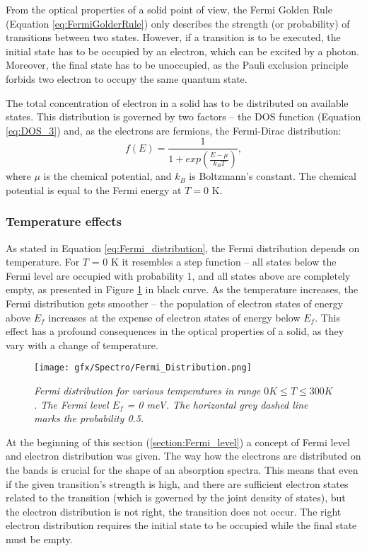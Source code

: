 \documentclass[titlepage,a4paper]{book}
\newcommand{\wciecie}{\quad\phantom{v}}
\begin{document}
From the optical properties of a solid point of view, the Fermi Golden Rule (Equation \ref{eq:FermiGolderRule}) only describes the strength (or probability) of transitions between two states. However, if a transition is to be executed, the initial state has to be occupied by an electron, which can be excited by a photon. Moreover, the final state has to be unoccupied, as the Pauli exclusion principle forbids two electron to occupy the same quantum state. 

The total concentration of electron in a solid has to be distributed on available states. This distribution is governed by two factors -- the DOS function (Equation \ref{eq:DOS_3}) and, as the electrons are fermions, the Fermi-Dirac distribution:
\begin{equation}
\label{eq:Fermi_distribution}
f(E) = \frac{1}{1+exp\left(\frac{E-\mu}{k_B T}\right)},
\end{equation}
where $\mu$ is the chemical potential, and $k_B$ is Boltzmann's constant. The chemical potential is equal to the Fermi energy at $T = 0$ K.

\subsubsection{Temperature effects}
\wciecie

As stated in Equation \ref{eq:Fermi_distribution}, the Fermi distribution depends on temperature. For $T$ = 0 K it resembles a step function -- all states below the Fermi level are occupied with probability 1, and all states above are completely empty, as presented in Figure \ref{fig:Fermi_Distribution} in black curve. As the temperature increases, the Fermi distribution gets smoother -- the population of electron states of energy above $E_f$ increases at the expense of electron states of energy below $E_f$. This effect has a profound consequences in the optical properties of a solid, as they vary with a change of temperature.

\begin{figure}[ht]
	\centering
	\texttt{[image: gfx/Spectro/Fermi\_Distribution.png]}
	\vspace{-10pt}
	\caption{\textit{Fermi distribution for various temperatures in range $0 K \leq T \leq 300 K$. The Fermi level $E_f$ = 0 meV. The horizontal grey dashed line marks the probability 0.5.}}
	\label{fig:Fermi_Distribution}
\end{figure}

At the beginning of this section (\ref{section:Fermi_level}) a concept of Fermi level and electron distribution was given. The way how the electrons are distributed on the bands is crucial for the shape of an absorption spectra. This means that even if the given transition's strength is high, and there are sufficient electron states related to the transition (which is governed by the joint density of states), but the electron distribution is not right, the transition does not occur. The right electron distribution requires the initial state to be occupied while the final state must be empty. 
\end{document}
